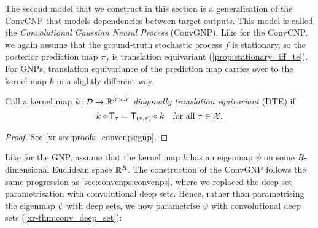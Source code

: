 \documentclass[12pt]{report}
\newcommand{\xrprefix}[1]{xr-#1}
\begin{document}
The second model that we construct in this section
is a generalisation of the ConvCNP that models dependencies between target outputs.
This model is called the \emph{Convolutional Gaussian Neural Process} (ConvGNP).
Like for the ConvCNP, we again assume that the ground-truth stochastic process $f$ is stationary, so the posterior prediction map $\pi_f$ is translation equivariant (\cref{prop:stationary_iff_te}).
For GNPs, translation equivariance of the prediction map carries over to the kernel map $k$ in a slightly different way.

\begin{definition}
    \label{def:diagonal_translation_equivariance_kernel_map}
    Call a kernel map $k \colon \mathcal{D} \to \mathbb{R}^{\mathcal{X} \times \mathcal{X}}$ \emph{diagonally translation equivariant} (DTE) if
    \begin{equation}
        k \comp \T_\tau = \T_{(\tau, \tau)} \comp k
        \quad \text{for all $\tau \in \X$.}
    \end{equation}
\end{definition}

\begin{proof}
    See \cref{\xrprefix{sec:proofs_convcnps:gnp}}.
\end{proof}

Like for the GNP, assume that the kernel map $k$ has an eigenmap $\psi$ on some $R$-dimensional Euclidean space $\mathbb{R}^R$.
The construction of the ConvGNP follows the same progression as \cref{sec:convcnps:convcnps}, where we replaced the deep set parametrisation with convolutional deep sets.
Hence, rather than parametrising the eigenmap $\psi$ with deep sets, we now parametrise $\psi$ with convolutional deep sets (\cref{\xrprefix{thm:conv_deep_set}}):
\end{document}

